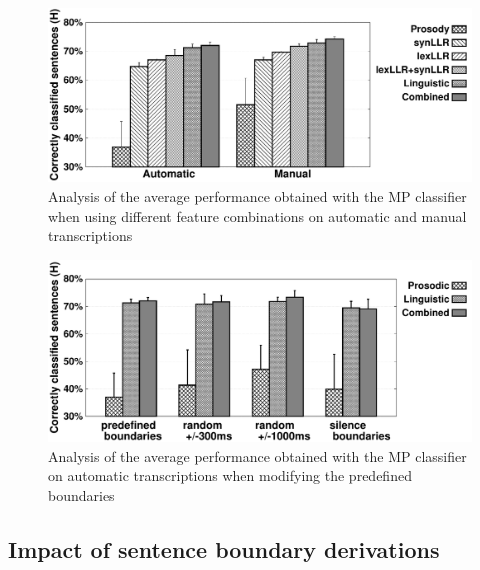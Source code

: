 \documentclass[conference]{IEEEtran}
\begin{document}
\begin{figure}[b!] 
\centering
\includegraphics[scale=0.39]{Image/MP_averageStats_compareFeatures_withSD_Gray.pdf}
\caption{Analysis of the average performance obtained with the MP classifier when using different feature combinations on automatic and manual transcriptions}
\label{Fig:Features}
\end{figure}




\begin{figure}[t!] 
\begin{center}
	\includegraphics[scale=0.395]{Image/MP_averageStats_differentBorders_Gray.pdf}
	\caption{Analysis of the average performance obtained with the MP classifier on automatic transcriptions when modifying the predefined boundaries}
\label{Fig:Borders}
\end{center}
\end{figure}

\subsection{Impact of sentence boundary derivations}
\end{document}
